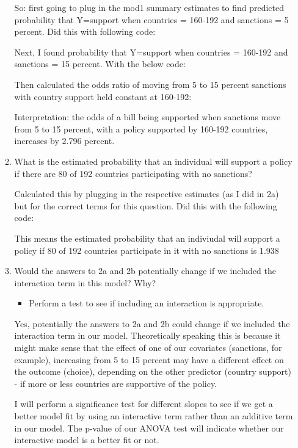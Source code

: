 \documentclass[12pt,letterpaper]{article}
\begin{document}
\begin{enumerate}
\begin{enumerate}
So: first going to plug in the mod1 summary estimates to find predicted probability that Y=support when countries = 160-192 and sanctions = 5 percent. Did this with following code:
 	

Next, I found probability that Y=support when countries = 160-192 and sanctions = 15 percent. With the below code:
 	

Then calculated the odds ratio of moving from 5 to 15 percent sanctions with country support held constant at 160-192:
 	

Interpretation: the odds of a bill being supported when sanctions move from 5 to 15 percent, with a policy supported by 160-192 countries, increases by 2.796 percent.


	\item
	What is the estimated probability that an individual will support a policy if there are 80 of 192 countries participating with no sanctions? 
	
Calculated this by plugging in the respective estimates (as I did in 2a) but for the correct terms for this question. Did this with the following code:
 	
	
This means the estimated probability that an indiviudal will support a policy if 80 of 192 countries participate in it with no sanctions is 1.938%

	
		\item
		Would the answers to 2a and 2b potentially change if we included the interaction term in this model? Why? 
		\begin{itemize}
			\item Perform a test to see if including an interaction is appropriate.
		\end{itemize}
	
Yes, potentially the answers to 2a and 2b could change if we included the interaction term in our model. Theoretically speaking this is because it might make sense that the effect of one of our covariates (sanctions, for example), increasing from 5 to 15 percent may have a different effect on the outcome (choice), depending on the other predictor (country support) - if more or less  countries are supportive of the policy.

I will perform a significance test for different slopes to see if we get a better model fit by using an interactive term rather than an additive term in our model. The p-value of our ANOVA test will indicate whether our interactive model is a better fit or not.


\end{enumerate}
\end{enumerate}
\end{document}
